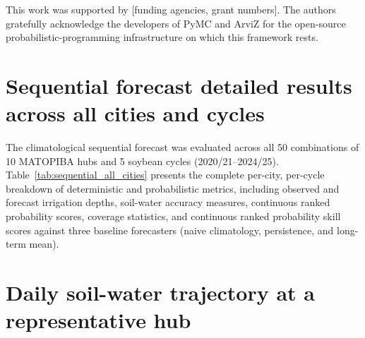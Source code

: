 \documentclass[review,5p,times]{elsarticle}
\begin{document}
This work was supported by [funding agencies, grant numbers].
The authors gratefully acknowledge the developers of PyMC and ArviZ
for the open-source probabilistic-programming infrastructure on which
this framework rests.








\appendix

\section{Sequential forecast detailed results across all cities and cycles}
\label{app:sequential_all_cities}

The climatological sequential forecast was evaluated across all 50
combinations of 10 MATOPIBA hubs and 5 soybean cycles (2020/21--2024/25).
Table~\ref{tab:sequential_all_cities} presents the complete per-city,
per-cycle breakdown of deterministic and probabilistic metrics,
including observed and forecast irrigation depths, soil-water accuracy
measures, continuous ranked probability scores, coverage statistics, and
continuous ranked probability skill scores against three baseline
forecasters (naive climatology, persistence, and long-term mean).



\section{Daily soil-water trajectory at a representative hub}
\label{app:trajectory_balsas}
\end{document}
